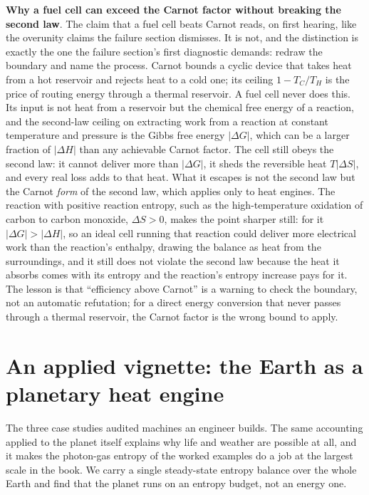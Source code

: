 \begin{mastery}
\textbf{Why a fuel cell can exceed the Carnot factor without breaking the second
law}. The claim that a fuel cell beats Carnot reads, on first hearing, like the
overunity claims the failure section dismisses. It is not, and the distinction
is exactly the one the failure section's first diagnostic demands: redraw the
boundary and name the process. Carnot bounds a cyclic device that takes heat
from a hot reservoir and rejects heat to a cold one; its ceiling $1 - T_C/T_H$
is the price of routing energy through a thermal reservoir. A fuel cell never
does this. Its input is not heat from a reservoir but the chemical free energy
of a reaction, and the second-law ceiling on extracting work from a reaction at
constant temperature and pressure is the Gibbs free energy $|\Delta G|$, which
can be a larger fraction of $|\Delta H|$ than any achievable Carnot factor. The
cell still obeys the second law: it cannot deliver more than $|\Delta G|$, it
sheds the reversible heat $T|\Delta S|$, and every real loss adds to that heat.
What it escapes is not the second law but the Carnot \emph{form} of the second
law, which applies only to heat engines. The reaction with positive reaction
entropy, such as the high-temperature oxidation of carbon to carbon monoxide,
$\Delta S > 0$, makes the point sharper still: for it $|\Delta G| > |\Delta H|$,
so an ideal cell running that reaction could deliver more electrical work than
the reaction's enthalpy, drawing the balance as heat from the surroundings, and
it still does not violate the second law because the heat it absorbs comes with
its entropy and the reaction's entropy increase pays for it. The lesson is that
``efficiency above Carnot'' is a warning to check the boundary, not an automatic
refutation; for a direct energy conversion that never passes through a thermal
reservoir, the Carnot factor is the wrong bound to apply.
\end{mastery}

\section{An applied vignette: the Earth as a planetary heat engine}

The three case studies audited machines an engineer builds. The same accounting
applied to the planet itself explains why life and weather are possible at all,
and it makes the photon-gas entropy of the worked examples do a job at the largest
scale in the book. We carry a single steady-state entropy balance over the whole
Earth and find that the planet runs on an entropy budget, not an energy one.

